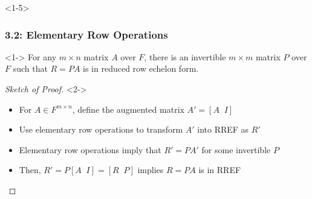 \documentclass[10pt,english,aspectratio=169]{beamer}
\begin{document}
\begin{frame}<1-5> \frametitle{3.2: Elementary Row Operations}


\begin{lemma}<1->
For any $m\times n$ matrix $A$ over $F$, there is an invertible $m \times m$ matrix $P$ over $F$ such that $R=PA$ is in reduced row echelon form.
\end{lemma}

\vspace{3mm}

\begin{proof}[Sketch of Proof]<2->
\begin{itemize}
\item<2-> For $A\in F^{m \times n}$, define the augmented matrix $A' = [A \;\; I]$
\item<3-> Use elementary row operations to transform $A'$ into RREF as $R'$
\item<4-> Elementary row operations imply that $R' = P A'$ for some invertible $P$
\item<5-> Then, $R' = P [A \;\; I] = [R \;\; P]$ implies $R=PA$ is in RREF \qedhere
\end{itemize}
\end{proof}


\end{frame}
\end{document}
